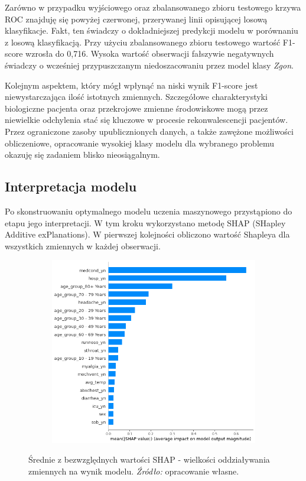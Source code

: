\documentclass[polish, twoside, 12pt, a4paper]{article}
\theoremstyle{definition}
\theoremstyle{plain}
\theoremstyle{remark}
\begin{document}
Zarówno w przypadku wyjściowego oraz zbalansowanego zbioru testowego krzywa ROC znajduję się powyżej czerwonej, przerywanej linii opisującej losową klasyfikacje. Fakt, ten świadczy o dokładniejszej predykcji modelu w porównaniu z losową klasyfikacją. Przy użyciu zbalansowanego zbioru testowego wartość F1-score wzrosła do 0,716. Wysoka wartość obserwacji fałszywie negatywnych świadczy o wcześniej przypuszczanym niedoszacowaniu przez model klasy \emph{Zgon}.

Kolejnym aspektem, który mógł wpłynąć na niski wynik F1-score jest niewystarczająca ilość istotnych zmiennych. Szczegółowe charakterystyki biologiczne pacjenta oraz przekrojowe zmienne środowiskowe mogą przez niewielkie odchylenia stać się kluczowe w procesie rekonwalescencji pacjentów. Przez ograniczone zasoby upublicznionych danych, a także zawężone możliwości obliczeniowe, opracowanie wysokiej klasy modelu dla wybranego problemu okazuję się zadaniem blisko nieosiągalnym.

\subsection{Interpretacja modelu}

Po skonstruowaniu optymalnego modelu uczenia maszynowego przystąpiono do etapu jego interpretacji. W tym kroku wykorzystano metodę SHAP (SHapley Additive exPlanations). W pierwszej kolejności obliczono wartość Shapleya dla wszystkich zmiennych w każdej obserwacji. 

\begin{figure}[H]
  \centering
  \begin{subfigure}[t]{\textwidth}
	\centering
    \includegraphics[width=10cm]{shap_abs.png}
  \end{subfigure}
  \captionsetup{margin=10pt,font=small,labelfont=bf,width=.8\textwidth}
  \caption{Średnie z bezwzględnych wartości SHAP  - wielkości oddziaływania zmiennych na wynik modelu. \textit{Źródło:} opracowanie własne.}
\end{figure}
\end{document}
